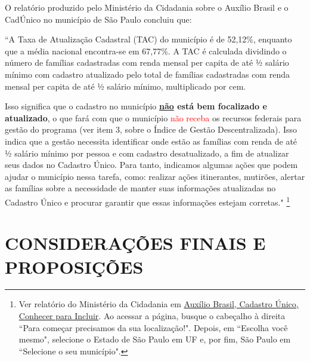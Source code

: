 \documentclass[14pt]{extarticle}
\begin{document}
O relatório produzido pelo Ministério da Cidadania sobre o Auxílio Brasil e o CadÚnico no município de São Paulo concluiu que:
\vspace{-0.5cm}
\begin{trivlist}\leftskip=4cm
\begin{singlespace}

\item\small  ``A Taxa de Atualização Cadastral (TAC) do município é de 52,12\%, enquanto que a média nacional encontra-se em 67,77\%. A TAC é calculada dividindo o número de famílias cadastradas com renda mensal per capita de até ½ salário mínimo com cadastro atualizado pelo total de famílias cadastradas com renda mensal per capita de até ½ salário mínimo, multiplicado por cem.\\

\item\small  Isso significa que o cadastro no município \textbf{\underline{não} está bem focalizado e atualizado}, o que fará com que o município {\textcolor{red}{não receba}} os recursos federais para gestão do programa (ver item 3, sobre o Índice de Gestão Descentralizada). Isso indica que a gestão necessita identificar onde estão as famílias com renda de até ½ salário mínimo por pessoa e com cadastro desatualizado, a fim de atualizar seus dados no Cadastro Único. Para tanto, indicamos algumas ações que podem ajudar o município nessa tarefa, como: realizar ações itinerantes, mutirões, alertar as famílias sobre a necessidade de manter suas informações atualizadas no Cadastro Único e procurar garantir que essas informações estejam corretas." \footnote{Ver relatório do Ministério da Cidadania em \href{https://aplicacoes.cidadania.gov.br/ri/pabcad/relatorio-completo.html}{Auxílio Brasil, Cadastro Único, Conhecer para Incluir}. Ao acessar a página, busque o cabeçalho à direita ``Para começar precisamos da sua localização!". Depois, em ``Escolha você mesmo", selecione o Estado de São Paulo em UF e, por fim, São Paulo em ``Selecione o seu município".}
\end{singlespace}
\end{trivlist}
\newpage


\section{\centering \MakeUppercase {Considerações Finais e Proposições}}
\label{parte_4}
\vspace{1cm}
\end{document}
